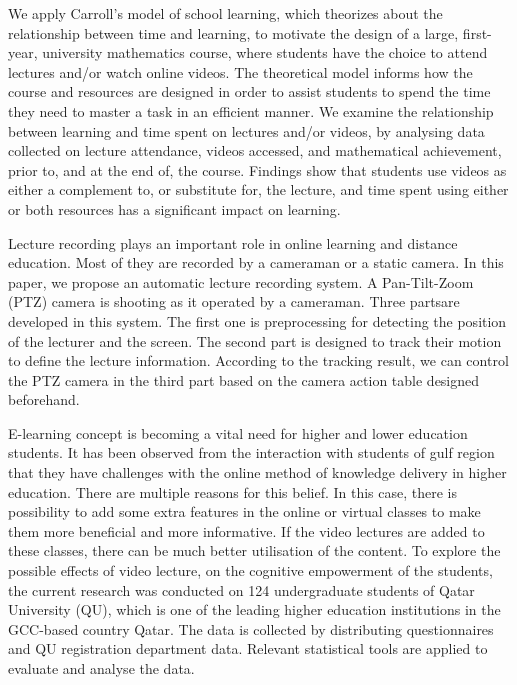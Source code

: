We apply Carroll's model of school learning, which theorizes about the relationship between time and learning, to motivate the design of a large, first-year, university mathematics course, where students have the choice to attend lectures and/or watch online videos. The theoretical model informs how the course and resources are designed in order to assist students to spend the time they need to master a task in an efficient manner. We examine the relationship between learning and time spent on lectures and/or videos, by analysing data collected on lecture attendance, videos accessed, and mathematical achievement, prior to, and at the end of, the course. Findings show that students use videos as either a complement to, or substitute for, the lecture, and time spent using either or both resources has a significant impact on learning.\cite{Meehan2019}


Lecture recording plays an important role in online learning and distance education. Most of they are recorded by a cameraman or a static camera. In this paper, we propose an automatic lecture recording system. A Pan-Tilt-Zoom (PTZ) camera is shooting as it operated by a cameraman. Three partsare developed in this system. The first one is preprocessing for detecting the position of the lecturer and the screen. The second part is designed to track their motion to define the lecture information. According to the tracking result, we can control the PTZ camera in the third part based on the camera action table designed beforehand.\cite{Chou2010}


E-learning concept is becoming a vital need for higher and lower education students. It has been observed from the interaction with students of gulf region that they have challenges with the online method of knowledge delivery in higher education. There are multiple reasons for this belief. In this case, there is possibility to add some extra features in the online or virtual classes to make them more beneficial and more informative. If the video lectures are added to these classes, there can be much better utilisation of the content. To explore the possible effects of video lecture, on the cognitive empowerment of the students, the current research was conducted on 124 undergraduate students of Qatar University (QU), which is one of the leading higher education institutions in the GCC-based country Qatar. The data is collected by distributing questionnaires and QU registration department data. Relevant statistical tools are applied to evaluate and analyse the data.\cite{Khan2016}


